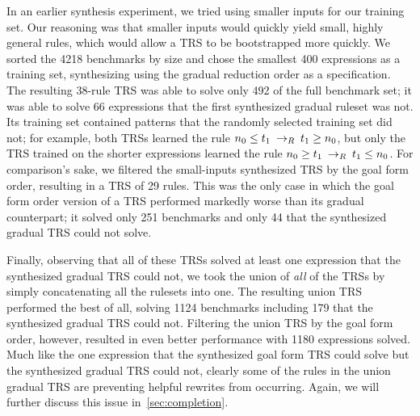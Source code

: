 In an earlier synthesis experiment, we tried using smaller inputs for our training set. Our reasoning was that smaller inputs would quickly yield small, highly general rules, which would allow a TRS to be bootstrapped more quickly. We sorted the 4218 benchmarks by size and chose the smallest 400 expressions as a training set, synthesizing using the gradual reduction order as a specification. The resulting 38-rule TRS was able to solve only 492 of the full benchmark set; it was able to solve 66 expressions that the first synthesized gradual ruleset was not. Its training set contained patterns that the randomly selected training set did not; for example, both TRSs learned the rule $n_0 \leq t_1 \:\rightarrow_{R}\: t_1 \geq n_0$, but only the TRS trained on the shorter expressions learned the rule $n_0 \geq t_1 \:\rightarrow_{R}\: t_1 \leq n_0$. For comparison's sake, we filtered the small-inputs synthesized TRS by the goal form order, resulting in a TRS of 29 rules. This was the only case in which the goal form order version of a TRS performed markedly worse than its gradual counterpart; it solved only 251 benchmarks and only 44 that the synthesized gradual TRS could not solve.

Finally, observing that all of these TRSs solved at least one expression that the synthesized gradual TRS could not, we took the union of \emph{all} of the TRSs by simply concatenating all the rulesets into one. The resulting union TRS performed the best of all, solving 1124 benchmarks including 179 that the synthesized gradual TRS could not. Filtering the union TRS by the goal form order, however, resulted in even better performance with 1180 expressions solved. Much like the one expression that the synthesized goal form TRS could solve but the synthesized gradual TRS could not, clearly some of the rules in the union gradual TRS are preventing helpful rewrites from occurring. Again, we will further discuss this issue in~\ref{sec:completion}.

